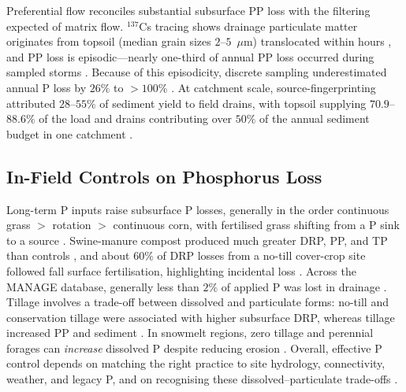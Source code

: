 Preferential flow reconciles substantial subsurface PP loss with the filtering
expected of matrix flow. $^{137}$Cs tracing shows drainage particulate matter
originates from topsoil (median grain sizes $2$--$5$~$\mu$m) translocated
within hours \parencite{Laubel1999,Uusitalo2001}, and PP loss is
episodic---nearly one-third of annual PP loss occurred during sampled storms
\parencite{Laubel1999,Grant1996}. Because of this episodicity, discrete
sampling underestimated annual P loss by $26\%$ to $>100\%$
\parencite{Grant1996}. At catchment scale, source-fingerprinting attributed
$28$--$55\%$ of sediment yield to field drains, with topsoil supplying
$70.9$--$88.6\%$ of the load and drains contributing over $50\%$ of the annual
sediment budget in one catchment \parencite{Walling2002,Chapman2005}.

\subsection{In-Field Controls on Phosphorus Loss}

Long-term P inputs raise subsurface P losses, generally in the order
continuous grass $>$ rotation $>$ continuous corn, with fertilised grass
shifting from a P sink to a source \parencite{Zhang2015b}. Swine-manure
compost produced much greater DRP, PP, and TP than controls
\parencite{Zhang2015}, and about $60\%$ of DRP losses from a no-till
cover-crop site followed fall surface fertilisation, highlighting incidental
loss \parencite{Macrae2023,Mumbi2025b}. Across the MANAGE database, generally
less than $2\%$ of applied P was lost in drainage \parencite{Christianson2016}.
Tillage involves a trade-off between dissolved and particulate forms: no-till
and conservation tillage were associated with higher subsurface DRP, whereas
tillage increased PP and sediment
\parencite{Ni2020,Macrae2023,Koskiaho2002}. In snowmelt regions, zero tillage
and perennial forages can \emph{increase} dissolved P despite reducing erosion
\parencite{Baulch2019}. Overall, effective P control depends on matching the
right practice to site hydrology, connectivity, weather, and legacy P, and on
recognising these dissolved--particulate trade-offs
\parencite{King2015,Ni2020,Baulch2019}.
